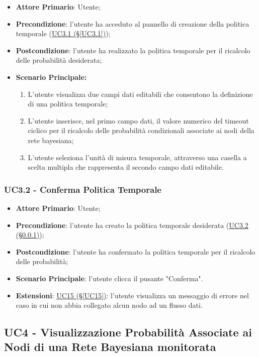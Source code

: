\begin{itemize}
	\item \textbf{Attore Primario}: Utente;
	\item \textbf{Precondizione}: l'utente ha acceduto al pannello di creazione della politica temporale (\hyperref[UC3.1]{UC3.1 (§\ref*{UC3.1})});
	\item \textbf{Postcondizione}: l'utente ha realizzato la politica temporale per il ricalcolo delle probabilità desiderata;
	\item \textbf{Scenario Principale:}
	\begin{enumerate}
		\item L'utente visualizza due campi dati editabili che consentono la definizione di una politica temporale;
		\item L'utente inserisce, nel primo campo dati, il valore numerico del timeout ciclico per il ricalcolo delle probabilità condizionali associate ai nodi della rete bayesiana;
		\item L'utente seleziona l'unità di misura temporale, attraverso una casella a scelta multipla che rappresenta il secondo campo dati editabile.
	\end{enumerate}

\end{itemize}

\subsubsection{UC3.2 - Conferma Politica Temporale}\label{UC3.2}
\begin{itemize}
	\item \textbf{Attore Primario}: Utente;
	\item \textbf{Precondizione}: l'utente ha creato la politica temporale desiderata (\hyperref[UC3.2]{UC3.2 (§\ref*{UC3.2})});
	\item \textbf{Postcondizione}: l'utente ha confermato la politica temporale per il ricalcolo delle probabilità;
	\item \textbf{Scenario Principale}: l'utente clicca il pusante "Conferma".
	\item \textbf{Estensioni}: \hyperref[UC15]{UC15 (§\ref*{UC15})}: l'utente visualizza un messaggio di errore nel caso in cui non abbia collegato alcun nodo ad un flusso dati.
\end{itemize}

\newpage

\subsection{UC4 - Visualizzazione Probabilità Associate ai Nodi di una Rete Bayesiana monitorata}\label{UC4}

